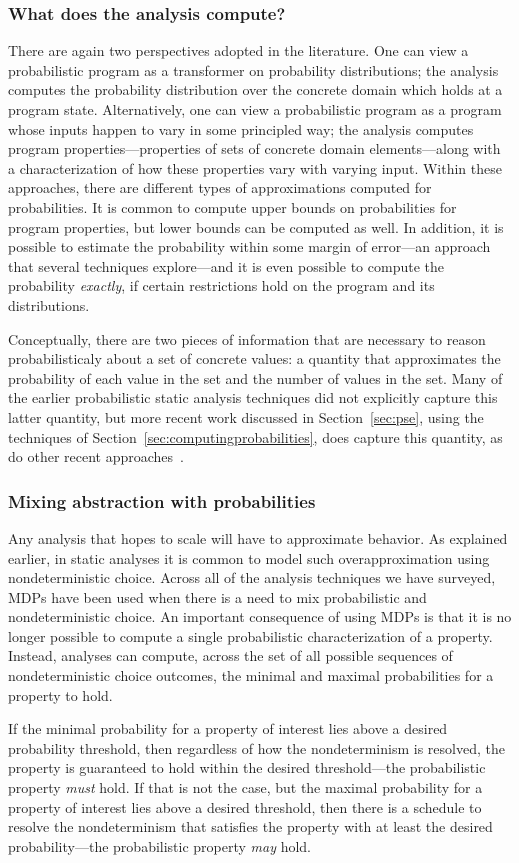 \subsubsection{What does the analysis compute?}
There are again two perspectives adopted in the literature.
One can view a probabilistic program as a transformer on probability
distributions; the analysis computes the probability distribution over the
concrete domain which holds at a program state.
Alternatively, one can view a probabilistic program as a program 
whose inputs happen
to vary in some principled way; the analysis computes program 
properties---properties of sets of concrete domain elements---along with a characterization
of how these properties vary with varying input.
Within these approaches, there are different types of approximations
computed for probabilities.  It is common to compute upper bounds
on probabilities for program properties, but lower bounds can 
be computed as well.  In addition, it is possible to estimate the
probability within some margin of error---an approach that several
techniques explore---and it is even possible to compute the probability
\textit{exactly}, if certain restrictions hold on the program and its distributions.

Conceptually, there are two pieces of information that are necessary
to reason probabilisticaly about a set of concrete values: a quantity
that approximates the probability of each value in the set 
and the number of values in the set.  
Many of the earlier probabilistic static analysis
techniques did not explicitly capture this latter quantity, but
more recent work discussed in Section~\ref{sec:pse}, using the
techniques of Section~\ref{sec:computingprobabilities}, 
does capture this quantity, as do other
recent approaches~\cite{mardziel2013dynamic}.


\subsubsection{Mixing abstraction with probabilities}
Any analysis that hopes to scale will have to approximate
behavior.  As explained earlier, in static analyses it is common
to model such overapproximation using nondeterministic choice.
Across all of the analysis techniques we have surveyed, MDPs
have been used when there is a need to mix probabilistic
and nondeterministic choice.   
An important consequence of using MDPs is that it is no longer possible
to compute a single probabilistic characterization of a property.
Instead, analyses can compute, across the set of all possible sequences
of nondeterministic choice outcomes, the minimal and maximal 
probabilities for a property to hold.

If the minimal probability for a property of interest lies above 
a desired probability threshold, then regardless of how the nondeterminism
is resolved, the property is guaranteed to hold within the desired 
threshold---the probabilistic property \textit{must} hold.  
If that is not the case, but the maximal probability for
a property of interest lies above a desired threshold, then there
is a schedule to resolve the nondeterminism that satisfies
the property with at least the desired probability---the probabilistic property \textit{may} hold.

